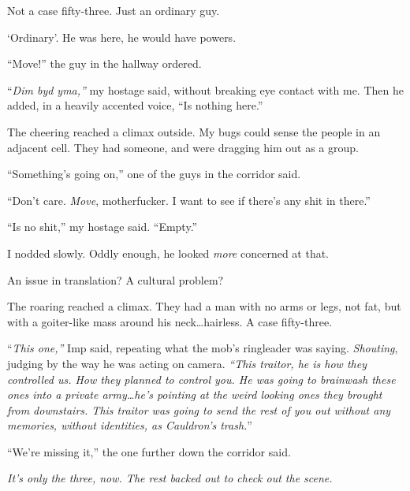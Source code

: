 Not a case fifty-three.  Just an ordinary guy.



`Ordinary'.  He was here, he would have powers.



``Move!'' the guy in the hallway ordered.



``\emph{Dim byd yma,'' }my hostage said, without breaking eye contact with me.  Then he added, in a heavily accented voice, ``Is nothing here.''



The cheering reached a climax outside.  My bugs could sense the people in an adjacent cell.  They had someone, and were dragging him out as a group.



``Something's going on,'' one of the guys in the corridor said.



``Don't care.  \emph{Move}, motherfucker.  I want to see if there's any shit in there.''



``Is no shit,'' my hostage said.  ``Empty.''



I nodded slowly.  Oddly enough, he looked \emph{more} concerned at that.



An issue in translation?  A cultural problem?



The roaring reached a climax.  They had a man with no arms or legs, not fat, but with a goiter-like mass around his neck\ldots hairless.  A case fifty-three.



``\emph{This one,'' }Imp said, repeating what the mob's ringleader was saying.  \emph{Shouting}, judging by the way he was acting on camera. \emph{ ``This traitor, he is how they controlled us.  How they planned to control you.  He was going to brainwash these ones into a private army\ldots he's pointing at the weird looking ones they brought from downstairs.  This traitor was going to send the rest of you out without any memories, without identities, as Cauldron's trash.}''



``We're missing it,'' the one further down the corridor said.



\emph{It's only the three, now.  The rest backed out to check out the scene.}



